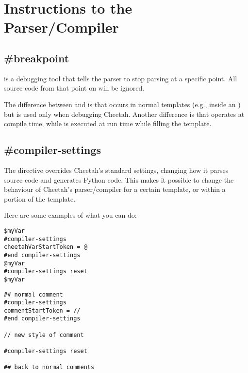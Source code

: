 \section{Instructions to the Parser/Compiler}
\label{parserInstructions}


\subsection{\#breakpoint}
\label{parserInstructions.breakpoint}

 is a debugging tool that tells the parser to stop
parsing at a specific point. All source code from that point on will be ignored.

The difference between  and  is that
 occurs in normal templates (e.g., inside an ) but
 is used only when debugging Cheetah.  Another difference is
that  operates at compile time, while  is
executed at run time while filling the template.


\subsection{\#compiler-settings}
\label{parserInstructions.compiler-settings}

The  directive overrides Cheetah's standard settings,
changing how it parses source code and generates Python code.  This
makes it possible to change the behaviour of Cheetah's parser/compiler for a
certain template, or within a portion of the template.

Here are some examples of what you can do:
\begin{verbatim}
$myVar
#compiler-settings
cheetahVarStartToken = @
#end compiler-settings
@myVar
#compiler-settings reset
$myVar
\end{verbatim}


\begin{verbatim}
## normal comment
#compiler-settings
commentStartToken = //
#end compiler-settings

// new style of comment

#compiler-settings reset

## back to normal comments
\end{verbatim}

